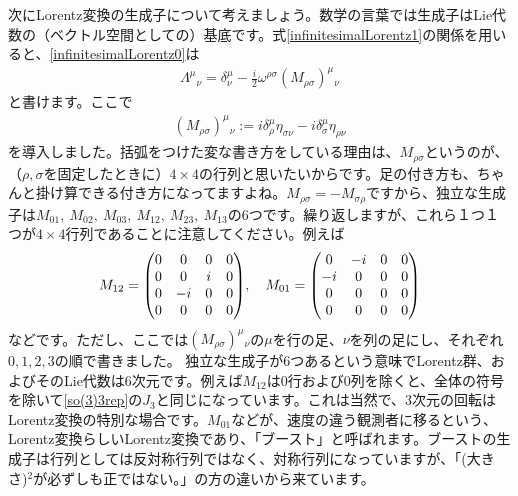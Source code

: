 \documentclass[report,paper=a4, fontsize=12pt, line_length=16cm, number_of_lines=33,dvipdfmx]{jlreq}
\numberwithin{equation}{chapter}
\begin{document}
次にLorentz変換の生成子について考えましょう。数学の言葉では生成子はLie代数の（ベクトル空間としての）基底です。式\eqref{infinitesimalLorentz1}の関係を用いると、\eqref{infinitesimalLorentz0}は
\begin{align}
  \Lambda^{\mu}{}_{\nu}=\delta^{\mu}_{\nu}-\frac{i}{2}\omega^{\rho\sigma}(M_{\rho\sigma})^{\mu}{}_{\nu}
\end{align}
と書けます。ここで
\begin{align}
  (M_{\rho\sigma})^{\mu}{}_{\nu}:=i\delta^{\mu}_{\rho}\eta_{\sigma\nu}-i\delta^{\mu}_{\sigma}\eta_{\rho\nu}\label{vectorrep0}
\end{align}
を導入しました。括弧をつけた変な書き方をしている理由は、$M_{\rho\sigma}$というのが、（$\rho,\sigma$を固定したときに）$4\times 4$の行列と思いたいからです。足の付き方も、ちゃんと掛け算できる付き方になってますよね。$M_{\rho\sigma}=-M_{\sigma\rho}$ですから、独立な生成子は$M_{01},\ M_{02},\ M_{03},\ M_{12},\ M_{23},\ M_{13}$の6つです。繰り返しますが、これら１つ１つが$4\times 4$行列であることに注意してください。例えば
\begin{align}
  M_{12}=\mqty(
    0 & 0 & 0 & 0 \\  
    0 & 0 & i & 0 \\  
    0 &-i & 0 & 0 \\  
    0 & 0 & 0 & 0 \\  
  ),\quad
  M_{01}=\mqty(
    0 & -i& 0 & 0 \\  
    -i& 0 & 0 & 0 \\  
    0 & 0 & 0 & 0 \\  
    0 & 0 & 0 & 0 \\  
  )
\end{align}
などです。ただし、ここでは$(M_{\rho\sigma})^{\mu}{}_{\nu}$の$\mu$を行の足、$\nu$を列の足にし、それぞれ$0,1,2,3$の順で書きました。
独立な生成子が6つあるという意味でLorentz群、およびそのLie代数は6次元です。例えば$M_{12}$は$0$行および$0$列を除くと、全体の符号を除いて\eqref{so(3)3rep}の$J_3$と同じになっています。これは当然で、3次元の回転はLorentz変換の特別な場合です。$M_{01}$などが、速度の違う観測者に移るという、Lorentz変換らしいLorentz変換であり、「ブースト」と呼ばれます。ブーストの生成子は行列としては反対称行列ではなく、対称行列になっていますが、「(大きさ)${}^2$が必ずしも正ではない。」の方の違いから来ています。
\end{document}
